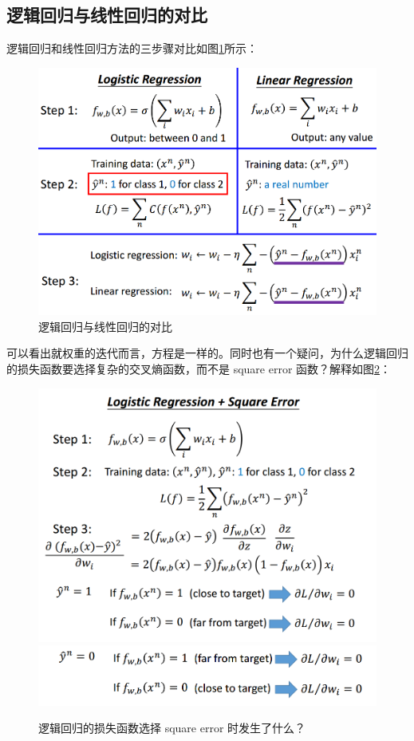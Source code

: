 \subsection{逻辑回归与线性回归的对比}
逻辑回归和线性回归方法的三步骤对比如图\ref{fig:log_reg_vs_liner_reg}所示：
\begin{figure}[htb]
	\centering
	\includegraphics[scale=0.4]{pic/log_reg_vs_liner_reg}
	\caption{逻辑回归与线性回归的对比}
	\label{fig:log_reg_vs_liner_reg}
\end{figure}
可以看出就权重的迭代而言，方程是一样的。同时也有一个疑问，为什么逻辑回归的损失函数要选择复杂的交叉熵函数，而不是 square error 函数？解释如图\ref{fig:when_log_reg_using_square_error}：
\begin{figure}[htb]
	\centering
	\includegraphics[scale=0.4]{pic/when_log_reg_using_square_error}
	\includegraphics[scale=0.4]{pic/when_log_reg_using_square_error_02}
	\caption{逻辑回归的损失函数选择 square error 时发生了什么？}
	\label{fig:when_log_reg_using_square_error}
\end{figure}
